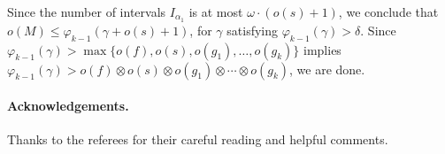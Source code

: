 \documentclass{article}
\theoremstyle{definition}
\begin{document}
Since the number of intervals $I_{\alpha_1}$ is at most $\omega\cdot(o(s)+1)$, we conclude that $o(M)\le \varphi_{k-1}(\gamma+o(s)+1)$, for $\gamma$ satisfying $\varphi_{k-1}(\gamma)>\delta$. Since $\varphi_{k-1}(\gamma)>\max\{o(f),o(s),o(g_1),\ldots,o(g_k)\}$ implies $\varphi_{k-1}(\gamma)>o(f)\otimes o(s)\otimes o(g_1)\otimes\cdots\otimes o(g_k)$, we are done.

\paragraph{Acknowledgements.} Thanks to the referees for their careful reading and helpful comments.


{}
\end{document}
